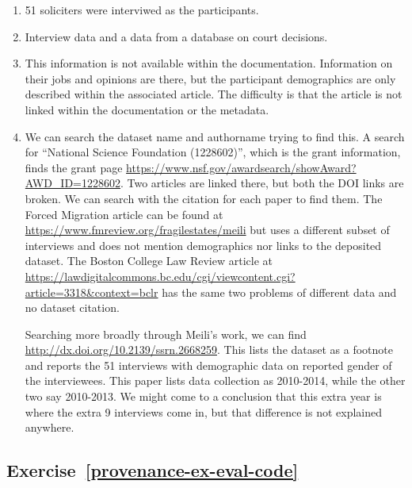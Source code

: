 \documentclass[
]{krantz}
\begin{document}
\begin{enumerate}
\def\labelenumi{\arabic{enumi}.}
\item
  51 soliciters were interviwed as the participants.
\item
  Interview data and a data from a database on court decisions.
\item
  This information is not available within the documentation.
  Information on their jobs and opinions are there,
  but the participant demographics are only described within the associated article.
  The difficulty is that the article is not linked within the documentation or the metadata.
\item
  We can search the dataset name and authorname trying to find this.
  A search for ``National Science Foundation (1228602)'',
  which is the grant information,
  finds the grant page \url{https://www.nsf.gov/awardsearch/showAward?AWD_ID=1228602}.
  Two articles are linked there,
  but both the DOI links are broken.
  We can search with the citation for each paper to find them.
  The Forced Migration article can be found at \url{https://www.fmreview.org/fragilestates/meili}
  but uses a different subset of interviews and does not mention demographics nor links to the deposited dataset.
  The Boston College Law Review article at \url{https://lawdigitalcommons.bc.edu/cgi/viewcontent.cgi?article=3318\&context=bclr}
  has the same two problems of different data and no dataset citation.

  Searching more broadly through Meili's work, we can find \url{http://dx.doi.org/10.2139/ssrn.2668259}.
  This lists the dataset as a footnote and reports the 51 interviews with demographic data on reported gender of the interviewees.
  This paper lists data collection as 2010-2014,
  while the other two say 2010-2013.
  We might come to a conclusion that this extra year is where the extra 9 interviews come in,
  but that difference is not explained anywhere.
\end{enumerate}

\hypertarget{exercise-refprovenance-ex-eval-code}{%
\subsection*{Exercise~\ref{provenance-ex-eval-code}}\label{exercise-refprovenance-ex-eval-code}}
\end{document}
